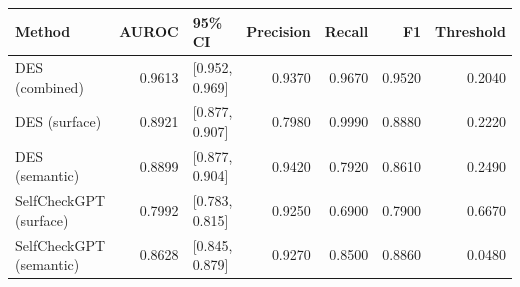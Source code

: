 \begin{tabular}{lrlrrrr}
\toprule
Method & AUROC & 95\% CI & Precision & Recall & F1 & Threshold \\
\midrule
DES (combined) & 0.9613 & [0.952, 0.969] & 0.9370 & 0.9670 & 0.9520 & 0.2040 \\
DES (surface) & 0.8921 & [0.877, 0.907] & 0.7980 & 0.9990 & 0.8880 & 0.2220 \\
DES (semantic) & 0.8899 & [0.877, 0.904] & 0.9420 & 0.7920 & 0.8610 & 0.2490 \\
SelfCheckGPT (surface) & 0.7992 & [0.783, 0.815] & 0.9250 & 0.6900 & 0.7900 & 0.6670 \\
SelfCheckGPT (semantic) & 0.8628 & [0.845, 0.879] & 0.9270 & 0.8500 & 0.8860 & 0.0480 \\
\bottomrule
\end{tabular}
